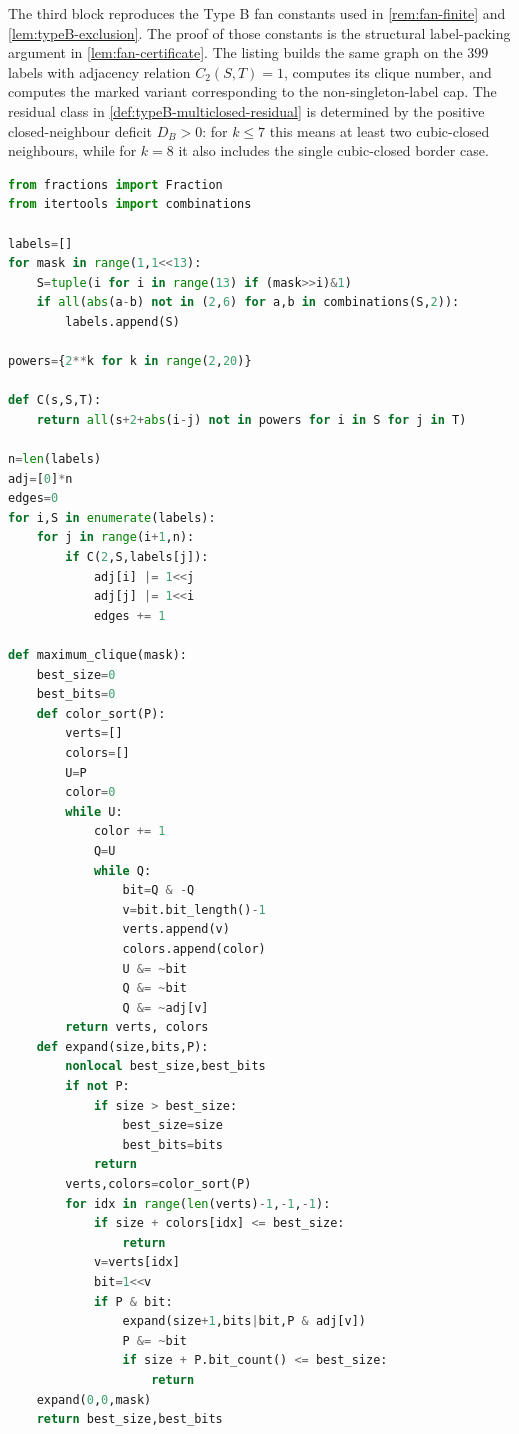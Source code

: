 \documentclass[11pt]{article}
\begin{document}
The third block reproduces the Type B fan constants used in
\cref{rem:fan-finite} and \cref{lem:typeB-exclusion}.  The proof of those
constants is the structural label-packing argument in
\cref{lem:fan-certificate}.  The listing builds the same graph on the $399$
labels with adjacency relation $C_2(S,T)=1$, computes its clique number, and
computes the marked variant corresponding to the non-singleton-label cap.  The
residual class in \cref{def:typeB-multiclosed-residual} is determined by the
positive closed-neighbour deficit $D_B>0$: for $k\le7$ this means at least two
cubic-closed neighbours, while for $k=8$ it also includes the single
cubic-closed border case.

\begin{lstlisting}[language=Python]
from fractions import Fraction
from itertools import combinations

labels=[]
for mask in range(1,1<<13):
    S=tuple(i for i in range(13) if (mask>>i)&1)
    if all(abs(a-b) not in (2,6) for a,b in combinations(S,2)):
        labels.append(S)

powers={2**k for k in range(2,20)}

def C(s,S,T):
    return all(s+2+abs(i-j) not in powers for i in S for j in T)

n=len(labels)
adj=[0]*n
edges=0
for i,S in enumerate(labels):
    for j in range(i+1,n):
        if C(2,S,labels[j]):
            adj[i] |= 1<<j
            adj[j] |= 1<<i
            edges += 1

def maximum_clique(mask):
    best_size=0
    best_bits=0
    def color_sort(P):
        verts=[]
        colors=[]
        U=P
        color=0
        while U:
            color += 1
            Q=U
            while Q:
                bit=Q & -Q
                v=bit.bit_length()-1
                verts.append(v)
                colors.append(color)
                U &= ~bit
                Q &= ~bit
                Q &= ~adj[v]
        return verts, colors
    def expand(size,bits,P):
        nonlocal best_size,best_bits
        if not P:
            if size > best_size:
                best_size=size
                best_bits=bits
            return
        verts,colors=color_sort(P)
        for idx in range(len(verts)-1,-1,-1):
            if size + colors[idx] <= best_size:
                return
            v=verts[idx]
            bit=1<<v
            if P & bit:
                expand(size+1,bits|bit,P & adj[v])
                P &= ~bit
                if size + P.bit_count() <= best_size:
                    return
    expand(0,0,mask)
    return best_size,best_bits


\end{lstlisting}
\end{document}
